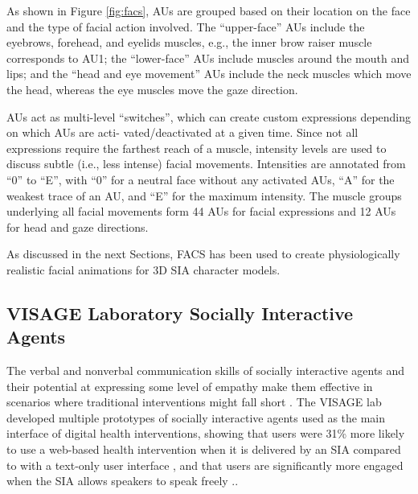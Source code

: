 \documentclass[12pt]{article}
\begin{document}
As shown in Figure \ref{fig:facs}, AUs
are grouped based on their location on the face and the
type of facial action involved. The “upper-face” AUs include
the eyebrows, forehead, and eyelids muscles, e.g., the inner
brow raiser muscle corresponds to AU1; the “lower-face”
AUs include muscles around the mouth and lips; and the
“head and eye movement” AUs include the neck muscles
which move the head, whereas the eye muscles move the
gaze direction.

AUs act as multi-level “switches”, which can create
custom expressions depending on which AUs are acti-
vated/deactivated at a given time. Since not all expressions
require the farthest reach of a muscle, intensity levels are
used to discuss subtle (i.e., less intense) facial movements.
Intensities are annotated from “0” to “E”, with “0” for a
neutral face without any activated AUs, “A” for the weakest
trace of an AU, and “E” for the maximum intensity.
The muscle groups underlying all facial movements
form 44 AUs for facial expressions and 12 AUs for head
and gaze directions.  

As discussed in the next Sections, FACS has been used to create physiologically realistic facial animations for 3D SIA character models.


\subsection{VISAGE Laboratory Socially Interactive Agents}

The verbal and nonverbal communication skills  of  socially interactive agents and their potential at expressing some level of empathy make them effective in scenarios where traditional interventions might fall short \cite{Lisetti2012}.  
The VISAGE lab developed multiple prototypes of socially interactive agents used as the main interface of digital health interventions, showing that users were  31\% more likely to use a web-based health intervention when it is delivered by an SIA compared to with a text-only user interface \cite{lisetti2013can}, and that users are significantly more engaged when the SIA allows speakers to speak freely \cite{Lisetti2015nowAll}.\cite{Yasavur2014letsTalk}. 
\end{document}

